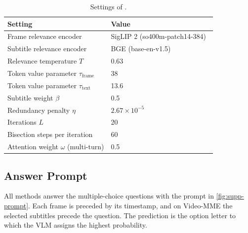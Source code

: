 \begin{table}[!htb]
  \centering
  \footnotesize
  \renewcommand{\arraystretch}{1.15}
  \setlength{\tabcolsep}{4pt}
  \begin{tabular}{l l}
    \toprule
    Setting & Value \\
    \midrule
    Frame relevance encoder & SigLIP 2 (so400m-patch14-384)~\cite{siglip2} \\
    Subtitle relevance encoder & BGE (base-en-v1.5)~\cite{bge} \\
    Relevance temperature $T$ & 0.63 \\
    \addlinespace[3pt]
    Token value parameter $\tau_{\text{frame}}$ & 38 \\
    Token value parameter $\tau_{\text{text}}$ & 13.6 \\
    Subtitle weight $\beta$ & 0.5 \\
    Redundancy penalty $\eta$ & $2.67\times10^{-5}$ \\
    \addlinespace[3pt]
    Iterations $L$ & 20 \\
    Bisection steps per iteration & 60 \\
    \addlinespace[3pt]
    Attention weight $\omega$ (multi-turn) & 0.5 \\
    \bottomrule
  \end{tabular}
  \caption{Settings of \name.}
  \label{tab:supp-hparams}
\end{table}

\subsection{Answer Prompt}
\label{sec:supp-prompt}

All methods answer the multiple-choice questions with the prompt in \cref{fig:supp-prompt}. Each frame is preceded by its timestamp, and on Video-MME the selected subtitles precede the question. The prediction is the option letter to which the VLM assigns the highest probability.

